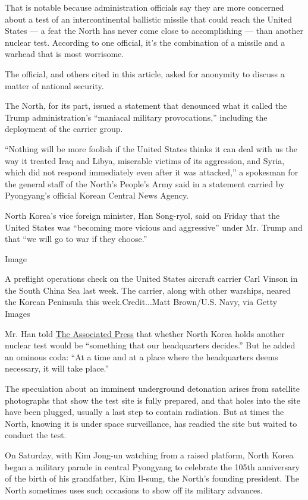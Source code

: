 That is notable because administration officials say they are more
concerned about a test of an intercontinental ballistic missile that
could reach the United States --- a feat the North has never come close
to accomplishing --- than another nuclear test. According to one
official, it's the combination of a missile and a warhead that is most
worrisome.

The official, and others cited in this article, asked for anonymity to
discuss a matter of national security.

The North, for its part, issued a statement that denounced what it
called the Trump administration's ``maniacal military provocations,''
including the deployment of the carrier group.

``Nothing will be more foolish if the United States thinks it can deal
with us the way it treated Iraq and Libya, miserable victims of its
aggression, and Syria, which did not respond immediately even after it
was attacked,'' a spokesman for the general staff of the North's
People's Army said in a statement carried by Pyongyang's official Korean
Central News Agency.

North Korea's vice foreign minister, Han Song-ryol, said on Friday that
the United States was ``becoming more vicious and aggressive'' under Mr.
Trump and that ``we will go to war if they choose.''

Image

A preflight operations check on the United States aircraft carrier Carl
Vinson in the South China Sea last week. The carrier, along with other
warships, neared the Korean Peninsula this week.Credit...Matt Brown/U.S.
Navy, via Getty Images

Mr. Han told
\href{http://bigstory.ap.org/article/7db133ff3bf94648be84d48a1babf4e3/n-korean-official-us-more-vicious-aggressive-under-trump}{The
Associated Press} that whether North Korea holds another nuclear test
would be ``something that our headquarters decides.'' But he added an
ominous coda: ``At a time and at a place where the headquarters deems
necessary, it will take place.''

The speculation about an imminent underground detonation arises from
satellite photographs that show the test site is fully prepared, and
that holes into the site have been plugged, usually a last step to
contain radiation. But at times the North, knowing it is under space
surveillance, has readied the site but waited to conduct the test.

On Saturday, with Kim Jong-un watching from a raised platform, North
Korea began a military parade in central Pyongyang to celebrate the
105th anniversary of the birth of his grandfather, Kim Il-sung, the
North's founding president. The North sometimes uses such occasions to
show off its military advances.

